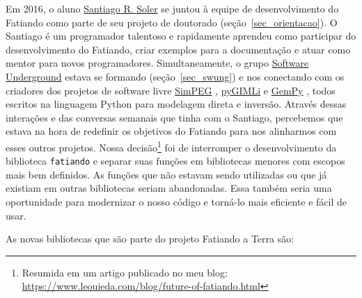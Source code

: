 \documentclass[12pt,a4paper,oneside]{book}
\newcommand{\SantiagoLink}{\href{https://www.santisoler.com/}{Santiago R. Soler}}
\begin{document}
Em 2016, o aluno \SantiagoLink{} se juntou à equipe de desenvolvimento do
Fatiando como parte de seu projeto de doutorado (seção~\ref{sec_orientacao}).
O Santiago é um programador talentoso e rapidamente aprendeu como participar
do desenvolvimento do Fatiando, criar exemplos para a documentação e atuar como
mentor para novos programadores.
Simultaneamente, o grupo
\href{https://softwareunderground.org/}{Software Underground} estava se
formando (seção~\ref{sec_swung}) e nos conectando com os criadores dos projetos
de software livre
\href{https://simpeg.xyz/}{SimPEG} \citep{Cockett2015},
\href{https://www.pygimli.org}{pyGIMLi} \citep{Rucker2017} e
\href{https://www.gempy.org/}{GemPy} \citep{delaVarga2019},
todos escritos na linguagem Python para modelagem direta e inversão.
Através dessas interações e das conversas semanais que tinha com o Santiago,
percebemos que estava na hora de redefinir os objetivos do Fatiando para
nos alinharmos com esses outros projetos.
Nossa decisão\footnote{Resumida em um artigo publicado no meu blog:
\url{https://www.leouieda.com/blog/future-of-fatiando.html}} foi de
interromper o desenvolvimento da biblioteca \texttt{fatiando} e separar suas
funções em bibliotecas menores com escopos mais bem definidos.
As funções que não estavam sendo utilizadas ou que já existiam em outras
bibliotecas seriam abandonadas.
Essa também seria uma oportunidade para modernizar o nosso código e torná-lo
mais eficiente e fácil de usar.

As novas bibliotecas que são parte do projeto Fatiando a Terra são:
\end{document}
